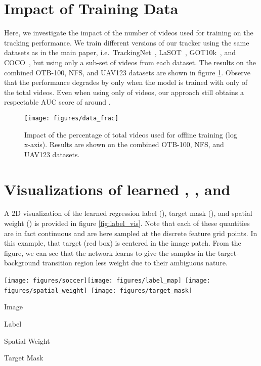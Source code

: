 \documentclass[10pt,twocolumn,letterpaper]{article}
\begin{document}
\section{Impact of Training Data}
\label{sec:less-data}
Here, we investigate the impact of the number of videos used for training on the tracking performance. We train different versions of our tracker using the same datasets as in the main paper, i.e.\ TrackingNet~\cite{TrackingNet}, LaSOT~\cite{LaSOT}, GOT10k~\cite{GOT10k}, and COCO~\cite{COCO}, but using only a sub-set of videos from each dataset. The results on the combined OTB-100, NFS, and UAV123 datasets are shown in figure \ref{fig:data_frac}. Observe that the performance degrades by only  when the model is trained with only  of the total videos. Even when using only  of videos, our approach still obtains a respectable AUC score of around .  

\begin{figure}[t]
	\centering \newcommand{\wid}{0.95\columnwidth}\texttt{[image: figures/data\_frac]}\vspace{-0mm}\caption{Impact of the percentage of total videos used for offline training (log x-axis). Results are shown on the combined OTB-100, NFS, and UAV123 datasets.}\label{fig:data_frac}\end{figure}

\section{Visualizations of learned , , and }
\label{sec:label_vis}
A 2D visualization of the learned regression label (), target mask (), and spatial weight () is provided in figure \ref{fig:label_vis}. Note that each of these quantities are in fact continuous and are here sampled at the discrete feature grid points. In this example, that target (red box) is centered in the image patch. From the figure, we can see that the network learns to give the samples in the target-background transition region less weight due to their ambiguous nature.

\begin{figure*}[t]
	\newcommand{\wid}{0.25\textwidth}\centering\vspace{0mm}\hspace{-2mm}\texttt{[image: figures/soccer]}\texttt{[image: figures/label\_map]}~\texttt{[image: figures/spatial\_weight]}~\texttt{[image: figures/target\_mask]}\vspace{-1mm}
	\parbox{.23\textwidth}{\centering\small Image}\parbox{.24\textwidth}{\centering\small Label }\parbox{.28\textwidth}{\centering\small Spatial Weight }\parbox{.27\textwidth}{\centering\small Target Mask }\vspace{0mm}\caption{Visualization of the learned label , spatial weight , and target mask . The red box denotes the target object.}\label{fig:label_vis}\vspace{-4mm}\end{figure*}
 
\end{document}
